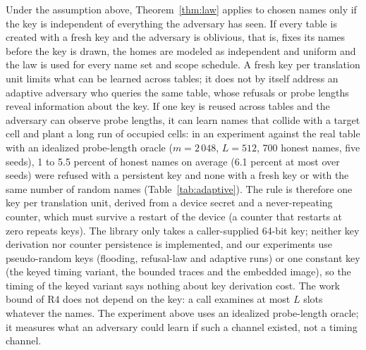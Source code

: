 Under the assumption above, Theorem~\ref{thm:law} applies to chosen names only if the key is independent of everything the adversary has seen. If every table is created with a fresh key and the adversary is oblivious, that is, fixes its names before the key is drawn, the homes are modeled as independent and uniform and the law is used for every name set and scope schedule. A fresh key per translation unit limits what can be learned across tables; it does not by itself address an adaptive adversary who queries the same table, whose refusals or probe lengths reveal information about the key. If one key is reused across tables and the adversary can observe probe lengths, it can learn names that collide with a target cell and plant a long run of occupied cells: in an experiment against the real table with an idealized probe-length oracle ($m=2\,048$, $L=512$, 700 honest names, five seeds), 1 to 5.5 percent of honest names on average (6.1 percent at most over seeds) were refused with a persistent key and none with a fresh key or with the same number of random names (Table~\ref{tab:adaptive}). The rule is therefore one key per translation unit, derived from a device secret and a never-repeating counter, which must survive a restart of the device (a counter that restarts at zero repeats keys). The library only takes a caller-supplied 64-bit key; neither key derivation nor counter persistence is implemented, and our experiments use pseudo-random keys (flooding, refusal-law and adaptive runs) or one constant key (the keyed timing variant, the bounded traces and the embedded image), so the timing of the keyed variant says nothing about key derivation cost. The work bound of R4 does not depend on the key: a call examines at most $L$ slots whatever the names. The experiment above uses an idealized probe-length oracle; it measures what an adversary could learn if such a channel existed, not a timing channel.

\begin{table}[t!]
\label{tab:adaptive}
\centering
\setlength{\tabcolsep}{3pt}
\resizebox{\columnwidth}{!}{}
\end{table}

